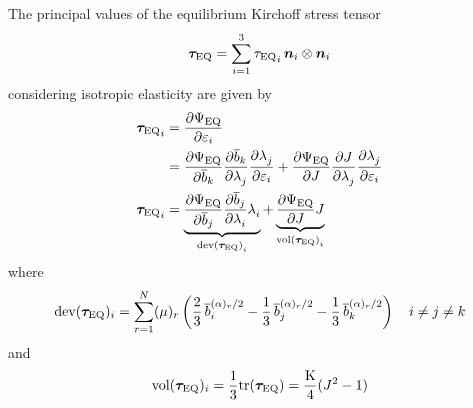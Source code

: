 The principal values of the equilibrium Kirchoff stress tensor
\begin{equation}
    \bm{\tau}_{\text{EQ}} = 
    \sum_{i=1}^{3} {{\tau}_{\text{EQ}}}_{i} \, \bm{n}_{i} \otimes \bm{n}_{i}
    \label{eq:taueq} 
\end{equation}
considering isotropic elasticity \cite[see Sec 6.2.3]{Zienkiewicz2014} are given by
\begin{align}
    {\bm{\tau}_{\text{EQ}}}_{i} &= \pdv{\Psi_{\text{EQ}}}{\varepsilon_{{i}}} \label{eq:principal_kirchoff_eq_1}\\
    \nonumber& = \pdv{\Psi_{\text{EQ}}}{\overline{b}_{{k}}} \pdv{\overline{b}_{{k}}}{\lambda^{}_{{j}}} \pdv{\lambda^{}_{{j}}}{\varepsilon_{{i}}} 
    + \pdv{\Psi_{\text{EQ}}}{J} \pdv{J}{\lambda^{}_{{j}}} \pdv{\lambda^{}_{{j}}}{\varepsilon_{{i}}} \\
    {\bm{\tau}_{\text{EQ}}}_{i} &= \underbrace{\pdv{\Psi_{\text{EQ}}}{\overline{b}_{{j}}} \pdv{\overline{b}_{{j}}}{\lambda^{}_{{i}}} \lambda^{}_{{i}}}_{\text{dev}{(\bm{\tau}_{\text{EQ}})}_{i}}
    + \underbrace{\pdv{\Psi_{\text{EQ}}}{J} J}_{\text{vol}{(\bm{\tau}_{\text{EQ}})}_{i}} \label{eq:principal_kirchoff_eq_2}
\end{align}
where
\begin{equation}
    \text{dev}{(\bm{\tau}_{\text{EQ}})_{i}} = \sum_{r=1}^{N} (\mu)_{r} \left( \frac{2}{3} \,\overline{b}_{{i}}^{(\alpha)_{r}/2} - \frac{1}{3} \,\overline{b}_{{j}}^{(\alpha)_{r}/2} - \frac{1}{3} \,\overline{b}_{{k}}^{(\alpha)_{r}/2} \right) \quad i \neq j \neq k 
    \label{eq:principal_kirchoff_stress_eq_dev}
\end{equation}
and 
\begin{equation}
    \text{vol}{(\bm{\tau}_{\text{EQ}})_{i}} = \frac{1}{3} \text{tr}(\bm{\tau}_{\text{EQ}}) 
    = \frac{\mathrm{K}}{4}(J^2-1)
    \label{eq:principal_kirchoff_stress_eq_vol}
\end{equation}


